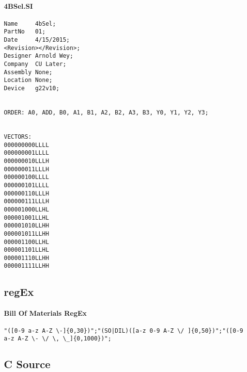 \documentclass[letterpaper,titlepage,oneside]{article}
\begin{document}
\paragraph*{4BSel.SI}
\label{code: 4BSelSi}
\begin{lstlisting}
Name     4bSel;
PartNo   01;
Date     4/15/2015;
<Revision></Revision>;
Designer Arnold Wey;
Company  CU Later;
Assembly None;
Location None;
Device   g22v10;


ORDER: A0, ADD, B0, A1, B1, A2, B2, A3, B3, Y0, Y1, Y2, Y3; 


VECTORS:
000000000LLLL
000000001LLLL
000000010LLLH
000000011LLLH
000000100LLLL
000000101LLLL
000000110LLLH
000000111LLLH
000001000LLHL
000001001LLHL
000001010LLHH
000001011LLHH
000001100LLHL
000001101LLHL
000001110LLHH
000001111LLHH
\end{lstlisting}

\clearpage

\subsection{regEx}
\paragraph*{Bill Of Materials RegEx\\}
\label{code: RegexClean}
\begin{lstlisting}
"([0-9 a-z A-Z \-]{0,30})";"(SO|DIL)([a-z 0-9 A-Z \/ ]{0,50})";"([0-9 a-z A-Z \- \/ \, \_]{0,1000})";
\end{lstlisting}

\clearpage

\subsection{C Source}
\end{document}
